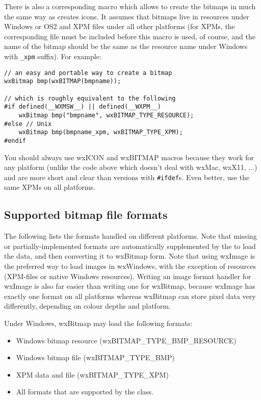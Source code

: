 There is also a corresponding  macro which allows
to create the bitmaps in much the same way as  creates
icons. It assumes that bitmaps live in resources under Windows or OS2 and XPM
files under all other platforms (for XPMs, the corresponding file must be
included before this macro is used, of course, and the name of the bitmap
should be the same as the resource name under Windows with {\tt \_xpm}
suffix). For example:

\begin{verbatim}
// an easy and portable way to create a bitmap
wxBitmap bmp(wxBITMAP(bmpname));

// which is roughly equivalent to the following
#if defined(__WXMSW__) || defined(__WXPM__)
    wxBitmap bmp("bmpname", wxBITMAP_TYPE_RESOURCE);
#else // Unix
    wxBitmap bmp(bmpname_xpm, wxBITMAP_TYPE_XPM);
#endif
\end{verbatim}

You should always use wxICON and wxBITMAP macros because they work for any
platform (unlike the code above which doesn't deal with wxMac, wxX11, ...) and
are more short and clear than versions with {\tt \#ifdef}s. Even better,
use the same XPMs on all platforms.

\subsection{Supported bitmap file formats}\label{supportedbitmapformats}

The following lists the formats handled on different platforms. Note
that missing or partially-implemented formats are automatically supplemented
by the  to load the data, and then converting
it to wxBitmap form. Note that using wxImage is the preferred way to
load images in wxWindows, with the exception of resources (XPM-files or
native Windows resources). Writing an image format handler for wxImage
is also far easier than writing one for wxBitmap, because wxImage has
exactly one format on all platforms whereas wxBitmap can store pixel data
very differently, depending on colour depths and platform.


Under Windows, wxBitmap may load the following formats:

\begin{itemize}\itemsep=0pt
\item Windows bitmap resource (wxBITMAP\_TYPE\_BMP\_RESOURCE)
\item Windows bitmap file (wxBITMAP\_TYPE\_BMP)
\item XPM data and file (wxBITMAP\_TYPE\_XPM)
\item All formats that are supported by the  class.
\end{itemize}

